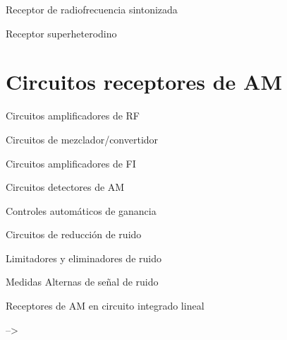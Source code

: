 \begin{frame}{Receptor de radiofrecuencia sintonizada}
\protect\hypertarget{receptor-de-radiofrecuencia-sintonizada}{}

\end{frame}

\begin{frame}{Receptor superheterodino}
\protect\hypertarget{receptor-superheterodino}{}

\end{frame}

\hypertarget{circuitos-receptores-de-am}{%
\section{Circuitos receptores de AM}\label{circuitos-receptores-de-am}}

\begin{frame}{Circuitos amplificadores de RF}
\protect\hypertarget{circuitos-amplificadores-de-rf}{}

\end{frame}

\begin{frame}{Circuitos de mezclador/convertidor}
\protect\hypertarget{circuitos-de-mezcladorconvertidor}{}

\end{frame}

\begin{frame}{Circuitos amplificadores de FI}
\protect\hypertarget{circuitos-amplificadores-de-fi}{}

\end{frame}

\begin{frame}{Circuitos detectores de AM}
\protect\hypertarget{circuitos-detectores-de-am}{}

\end{frame}

\begin{frame}{Controles automáticos de ganancia}
\protect\hypertarget{controles-automuxe1ticos-de-ganancia}{}

\end{frame}

\begin{frame}{Circuitos de reducción de ruido}
\protect\hypertarget{circuitos-de-reducciuxf3n-de-ruido}{}

\end{frame}

\begin{frame}{Limitadores y eliminadores de ruido}
\protect\hypertarget{limitadores-y-eliminadores-de-ruido}{}

\end{frame}

\begin{frame}{Medidas Alternas de señal de ruido}
\protect\hypertarget{medidas-alternas-de-seuxf1al-de-ruido}{}

\end{frame}

\begin{frame}{Receptores de AM en circuito integrado lineal}
\protect\hypertarget{receptores-de-am-en-circuito-integrado-lineal}{}

--\textgreater{}

\end{frame}
